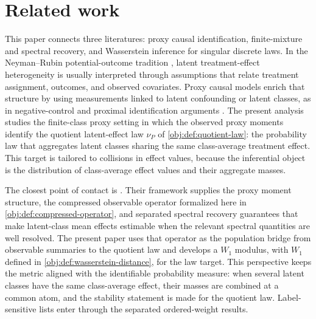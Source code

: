 \section{Related work}

This paper connects three literatures: proxy causal identification, finite-mixture and spectral recovery, and Wasserstein inference for singular discrete laws. In the Neyman--Rubin potential-outcome tradition \citep{Neyman1990,Rubin1974,Holland1986,ImbensRubin2015}, latent treatment-effect heterogeneity is usually interpreted through assumptions that relate treatment assignment, outcomes, and observed covariates. Proxy causal models enrich that structure by using measurements linked to latent confounding or latent classes, as in negative-control and proximal identification arguments \citep{MiaoGengTchetgen2018,TchetgenTchetgen2024,ShiMiaoNelsonTchetgen2020,CuiPuShiMiaoTchetgen2024,MiaoHuOgburnZhou2023,QiMiaoZhang2024,LiuParkLiTchetgen2024,LiLindermanShiTchetgen2024,AiShan2025,SahaBatesShah2026}. The present analysis studies the finite-class proxy setting in which the observed proxy moments identify the quotient latent-effect law \(\nu_P\) of \cref{obj:def:quotient-law}: the probability law that aggregates latent classes sharing the same class-average treatment effect. This target is tailored to collisions in effect values, because the inferential object is the distribution of class-average effect values and their aggregate masses.

The closest point of contact is \citet{VirkMazaheriWu2026}. Their framework supplies the proxy moment structure, the compressed observable operator formalized here in \cref{obj:def:compressed-operator}, and separated spectral recovery guarantees that make latent-class mean effects estimable when the relevant spectral quantities are well resolved. The present paper uses that operator as the population bridge from observable summaries to the quotient law and develops a \(W_1\) modulus, with \(W_1\) defined in \cref{obj:def:wasserstein-distance}, for the law target. This perspective keeps the metric aligned with the identifiable probability measure: when several latent classes have the same class-average effect, their masses are combined at a common atom, and the stability statement is made for the quotient law. Label-sensitive lists enter through the separated ordered-weight results.

